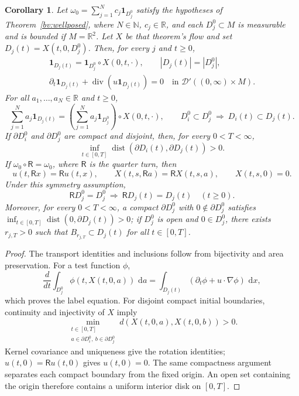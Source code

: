 \documentclass[11pt]{amsart}
\newtheorem{corollary}[theorem]{Corollary}
\theoremstyle{remark}
\numberwithin{equation}{section}
\newcommand{\R}{\mathbb R}
\newcommand{\dd}{\,\mathrm d}
\begin{document}
\begin{corollary}
\label{bv:labels}
Let $\omega_0=\sum_{j=1}^Nc_j\mathbf1_{D_j^0}$ satisfy the
hypotheses of Theorem~\ref{bv:wellposed}, where $N\in\mathbb N$,
$c_j\in\R$, and each $D_j^0\subset M$ is measurable and is bounded
if $M=\R^2$. Let $X$ be that theorem's flow and set
$D_j(t)=X(t,0,D_j^0)$. Then, for every $j$ and $t\ge0$,
\begin{equation}\label{bv:labeltransport}
 \begin{gathered}
 \mathbf1_{D_j(t)}=\mathbf1_{D_j^0}\circ X(0,t,\cdot),\qquad
 |D_j(t)|=|D_j^0|,\\
 \partial_t\mathbf1_{D_j(t)}+
        \operatorname{div}(u\mathbf1_{D_j(t)})=0
        \quad\text{in }\mathcal D'((0,\infty)\times M).
 \end{gathered}
\end{equation}
For all $a_1,\ldots,a_N\in\R$ and $t\ge0$,
\[
 \sum_{j=1}^Na_j\mathbf1_{D_j(t)}
  =\left(\sum_{j=1}^Na_j\mathbf1_{D_j^0}\right)\circ X(0,t,\cdot),
 \qquad
 D_i^0\subset D_j^0\ \Longrightarrow\ D_i(t)\subset D_j(t).
\]
If $\partial D_i^0$ and $\partial D_j^0$ are compact and disjoint,
then, for every $0<T<\infty$,
\[
 \inf_{t\in[0,T]}\operatorname{dist}(\partial D_i(t),\partial D_j(t))>0.
\]
If $\omega_0\circ\mathsf R=\omega_0$, where $\mathsf R$ is the
quarter turn, then
\[
 u(t,\mathsf Rx)=\mathsf Ru(t,x),\qquad
 X(t,s,\mathsf Ra)=\mathsf RX(t,s,a),\qquad X(t,s,0)=0.
\]
Under this symmetry assumption,
\[
 \mathsf RD_j^0=D_j^0\ \Longrightarrow\ \mathsf RD_j(t)=D_j(t)
 \quad(t\ge0).
\]
Moreover, for every $0<T<\infty$, a compact $\partial D_j^0$ with
$0\notin\partial D_j^0$ satisfies
$\inf_{t\in[0,T]}\operatorname{dist}(0,\partial D_j(t))>0$; if
$D_j^0$ is open and $0\in D_j^0$, there exists $r_{j,T}>0$ such
that $B_{r_{j,T}}\subset D_j(t)$ for all $t\in[0,T]$.
\end{corollary}
\begin{proof}
The transport identities and inclusions follow from bijectivity
and area preservation. For a test function $\phi$,
\[
 \frac{d}{dt}\int_{D_j^0}\phi(t,X(t,0,a))\,\dd a
 =\int_{D_j(t)}(\partial_t\phi+u\cdot\nabla\phi)\,\dd x,
\]
which proves the label equation. For disjoint compact initial
boundaries, continuity and injectivity of $X$ imply
\[
 \min_{\substack{t\in[0,T]\\a\in\partial D_i^0,\ b\in\partial D_j^0}}
       d(X(t,0,a),X(t,0,b))>0.
\]
Kernel covariance and uniqueness give the rotation identities;
$u(t,0)=\mathsf Ru(t,0)$ gives $u(t,0)=0$. The same compactness
argument separates each compact boundary from the fixed origin.
An open set containing the origin therefore contains a uniform
interior disk on $[0,T]$.
\end{proof}
\end{document}
